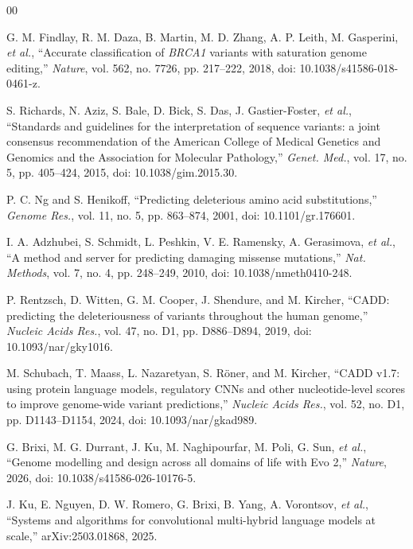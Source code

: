 \documentclass[conference,a4paper]{IEEEtran}
\begin{document}
\begin{thebibliography}{00}

 G. M. Findlay, R. M. Daza, B. Martin, M. D. Zhang, A. P. Leith, M. Gasperini, \emph{et al.}, ``Accurate classification of \emph{BRCA1} variants with saturation genome editing,'' \textit{Nature}, vol. 562, no. 7726, pp. 217--222, 2018, doi: 10.1038/s41586-018-0461-z.

 S. Richards, N. Aziz, S. Bale, D. Bick, S. Das, J. Gastier-Foster, \emph{et al.}, ``Standards and guidelines for the interpretation of sequence variants: a joint consensus recommendation of the American College of Medical Genetics and Genomics and the Association for Molecular Pathology,'' \textit{Genet. Med.}, vol. 17, no. 5, pp. 405--424, 2015, doi: 10.1038/gim.2015.30.

 P. C. Ng and S. Henikoff, ``Predicting deleterious amino acid substitutions,'' \textit{Genome Res.}, vol. 11, no. 5, pp. 863--874, 2001, doi: 10.1101/gr.176601.

 I. A. Adzhubei, S. Schmidt, L. Peshkin, V. E. Ramensky, A. Gerasimova, \emph{et al.}, ``A method and server for predicting damaging missense mutations,'' \textit{Nat. Methods}, vol. 7, no. 4, pp. 248--249, 2010, doi: 10.1038/nmeth0410-248.

 P. Rentzsch, D. Witten, G. M. Cooper, J. Shendure, and M. Kircher, ``CADD: predicting the deleteriousness of variants throughout the human genome,'' \textit{Nucleic Acids Res.}, vol. 47, no. D1, pp. D886--D894, 2019, doi: 10.1093/nar/gky1016.

 M. Schubach, T. Maass, L. Nazaretyan, S. R\"oner, and M. Kircher, ``CADD v1.7: using protein language models, regulatory CNNs and other nucleotide-level scores to improve genome-wide variant predictions,'' \textit{Nucleic Acids Res.}, vol. 52, no. D1, pp. D1143--D1154, 2024, doi: 10.1093/nar/gkad989.

 G. Brixi, M. G. Durrant, J. Ku, M. Naghipourfar, M. Poli, G. Sun, \emph{et al.}, ``Genome modelling and design across all domains of life with Evo 2,'' \textit{Nature}, 2026, doi: 10.1038/s41586-026-10176-5.

 J. Ku, E. Nguyen, D. W. Romero, G. Brixi, B. Yang, A. Vorontsov, \emph{et al.}, ``Systems and algorithms for convolutional multi-hybrid language models at scale,'' arXiv:2503.01868, 2025.


\end{thebibliography}
\end{document}
